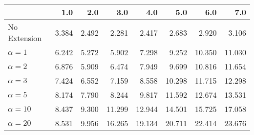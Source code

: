 \begin{tabular}{lrrrrrrr}
\toprule
{} &   1.0 &   2.0 &    3.0 &    4.0 &    5.0 &    6.0 &    7.0 \\
\midrule
No Extension  & 3.384 & 2.492 &  2.281 &  2.417 &  2.683 &  2.920 &  3.106 \\
$\alpha = 1$  & 6.242 & 5.272 &  5.902 &  7.298 &  9.252 & 10.350 & 11.030 \\
$\alpha = 2$  & 6.876 & 5.909 &  6.474 &  7.949 &  9.699 & 10.816 & 11.654 \\
$\alpha = 3$  & 7.424 & 6.552 &  7.159 &  8.558 & 10.298 & 11.715 & 12.298 \\
$\alpha = 5$  & 8.174 & 7.790 &  8.244 &  9.817 & 11.592 & 12.674 & 13.531 \\
$\alpha = 10$ & 8.437 & 9.300 & 11.299 & 12.944 & 14.501 & 15.725 & 17.058 \\
$\alpha = 20$ & 8.531 & 9.956 & 16.265 & 19.134 & 20.711 & 22.414 & 23.676 \\
\bottomrule
\end{tabular}
